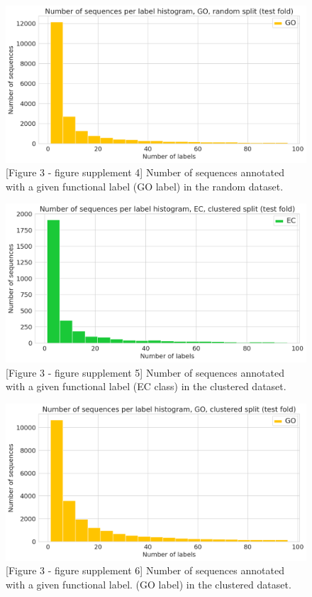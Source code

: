 \begin{figure}[htbp]
\centering
  \includegraphics[width=\textwidth]{sequences_per_label_go_random.png}
  \caption{ [Figure 3 - figure supplement 4] Number of sequences annotated with a given functional label (GO label) in the random dataset.}
\end{figure}

\begin{figure}[htbp]
\centering
  \includegraphics[width=\textwidth]{sequences_per_label_ec_clustered.png}
  \caption{ [Figure 3 - figure supplement 5] Number of sequences annotated with a given functional label (EC class) in the clustered dataset.}
\end{figure}
\begin{figure}[htbp]
\centering
  \includegraphics[width=\textwidth]{sequences_per_label_go_clustered.png}
  \caption{ [Figure 3 - figure supplement 6] Number of sequences annotated with a given functional label. (GO label) in the clustered dataset.}
\end{figure}

